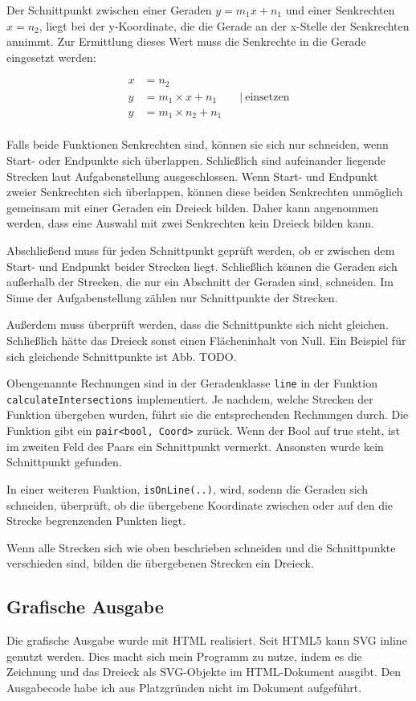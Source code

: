 Der Schnittpunkt zwischen einer Geraden \(y=m_1x+n_1\) und einer Senkrechten \(x=n_2\),
liegt bei der y-Koordinate, die die Gerade an der x-Stelle der Senkrechten annimmt.
Zur Ermittlung dieses Wert muss die Senkrechte in die Gerade eingesetzt werden:

\begin{equation}
    \begin{aligned}
        x &= n_2                    \\
        y &= m_1 \times x + n_1 \qquad\vert\ \text{einsetzen}  \\
        y &= m_1 \times n_2 + n_1   \\
    \end{aligned}
    \label{eq:senkrechtschnitt}
\end{equation}

Falls beide Funktionen Senkrechten sind, können sie sich nur schneiden,
wenn Start- oder Endpunkte sich überlappen.
Schließlich sind aufeinander liegende Strecken laut Aufgabenstellung ausgeschlossen.
Wenn Start- und Endpunkt zweier Senkrechten sich überlappen,
können diese beiden Senkrechten unmöglich gemeinsam mit einer Geraden
ein Dreieck bilden. Daher kann angenommen werden, dass eine Auswahl mit zwei Senkrechten
kein Dreieck bilden kann.

Abschließend muss für jeden Schnittpunkt geprüft werden,
ob er zwischen dem Start- und Endpunkt beider Strecken liegt.
Schließlich können die Geraden sich außerhalb der Strecken,
die nur ein Abschnitt der Geraden sind, schneiden.
Im Sinne der Aufgabenstellung zählen nur Schnittpunkte der Strecken.

Außerdem muss überprüft werden, dass die Schnittpunkte sich nicht gleichen.
Schließlich hätte das Dreieck sonst einen Flächeninhalt von Null.
Ein Beispiel für sich gleichende Schnittpunkte ist Abb. TODO.

Obengenannte Rechnungen sind in der Geradenklasse \texttt{line} in der Funktion
\texttt{calculateIntersections} implementiert.
Je nachdem, welche Strecken der Funktion übergeben wurden,
führt sie die entsprechenden Rechnungen durch.
Die Funktion gibt ein \texttt{pair<bool, Coord>} zurück.
Wenn der Bool auf true steht,
ist im zweiten Feld des Paars ein Schnittpunkt vermerkt.
Ansonsten wurde kein Schnittpunkt gefunden.

In einer weiteren Funktion, \texttt{isOnLine(..)}, wird, sodenn
die Geraden sich schneiden, überprüft, ob die übergebene Koordinate zwischen
oder auf den die Strecke begrenzenden Punkten liegt.

Wenn alle Strecken sich wie oben beschrieben schneiden und die Schnittpunkte verschieden
sind, bilden die übergebenen Strecken ein Dreieck.

\subsection {Grafische Ausgabe}
Die grafische Ausgabe wurde mit HTML realisiert. Seit HTML5 kann SVG inline genutzt
werden.
Dies macht sich mein Programm zu nutze, indem es die Zeichnung und das Dreieck
als SVG-Objekte im HTML-Dokument ausgibt.
Den Ausgabecode habe ich aus Platzgründen nicht im Dokument aufgeführt.
